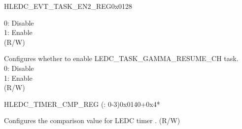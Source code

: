 \begin{register}{H}{LEDC\_EVT\_TASK\_EN2\_REG}{0x0128}
\begin{regdesc}
\begin{reglist}
0: Disable\\
1: Enable \\
(R/W)
\label{fielddesc:LEDCTASKGAMMARESUMECHNEN}\item [LEDC\_TASK\_GAMMA\_RESUME\_CH\regindex{n}\_EN (\regindex{n}: 0-7)] Configures whether to enable LEDC\_TASK\_GAMMA\_RESUME\_CH task.\\
0: Disable\\
1: Enable \\
(R/W)
\end{reglist}\end{regdesc}
\end{register}


\begin{register}{H}{LEDC\_TIMER\_CMP\_REG (: 0-3)}{0x0140+0x4*}\label{regdesc:LEDCTIMERXCMPREG}
%
%
\regnewline%
\begin{regdesc}\begin{reglist}
\label{fielddesc:LEDCTIMERXCMP}\item [LEDC\_TIMER\regindex{x}\_CMP] Configures the comparison value for LEDC timer . (R/W)
\end{reglist}\end{regdesc}
\end{register}


